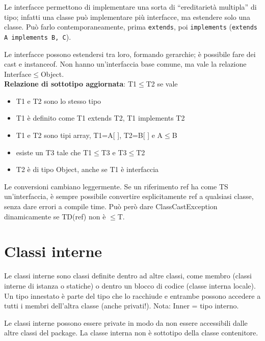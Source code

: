 Le interfacce permettono di implementare una sorta di “ereditarietà multipla” di tipo; infatti una classe può implementare più interfacce, ma estendere solo una classe. Può farlo contemporaneamente, prima \texttt{extends}, poi \texttt{implements} (\texttt{extends A implements B, C}).

Le interfacce possono estendersi tra loro, formando gerarchie; è possibile fare dei cast e instanceof. Non hanno un'interfaccia base comune, ma vale la relazione Interface$\le$Object. \\
\textbf{Relazione di sottotipo aggiornata}: T1$\le$T2 se vale
\begin{itemize}
\item T1 e T2 sono lo stesso tipo
\item T1 è definito come T1 extends T2, T1 implements T2
\item T1 e T2 sono tipi array, T1=A[ ], T2=B[ ] e A$\le$B
\item esiste un T3 tale che T1$\le$T3 e T3$\le$T2
\item T2 è di tipo Object, anche se T1 è interfaccia
\end{itemize}
Le conversioni cambiano leggermente. Se un riferimento ref ha come TS un'interfaccia, è sempre possibile convertire esplicitamente ref a qualsiasi classe, senza dare errori a compile time. Può però dare ClassCastException dinamicamente se TD(ref) non è $\le$T.

\section{Classi interne}
Le classi interne sono classi definite dentro ad altre classi, come membro (classi interne di istanza o statiche) o dentro un blocco di codice (classe interna locale). Un tipo innestato è parte del tipo che lo racchiude e entrambe possono accedere a tutti i membri dell'altra classe (anche privati!). Nota: Inner = tipo interno.

Le classi interne possono essere private in modo da non essere accessibili dalle altre classi del package.
La classe interna non è sottotipo della classe contenitore.
